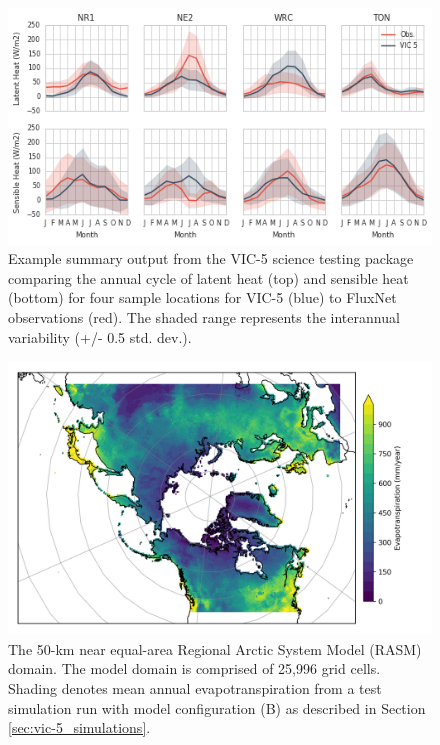 \documentclass[gmd, manuscript]{copernicus}
\begin{document}
\clearpage
\begin{figure}[t]
\includegraphics[width=12cm]{VIC_science_tests_fluxes.png}
\caption{Example summary output from the VIC-5 science testing package comparing the annual cycle of latent heat (top) and sensible heat (bottom) for four sample locations for VIC-5 (blue) to FluxNet observations (red). The shaded range represents the interannual variability (+/- 0.5 std. dev.).}
\label{fig:vic_fluxes}
\end{figure}


\clearpage
\begin{figure}[t]
\includegraphics[width=6in]{RASM_domain_fig.png}
\caption{The 50-km near equal-area Regional Arctic System Model (RASM) domain. The model domain is comprised of 25,996 grid cells. Shading denotes mean annual evapotranspiration from a test simulation run with model configuration (B) as described in Section \ref{sec:vic-5_simulations}.}
\label{fig:vic_domain}
\end{figure}
\end{document}
